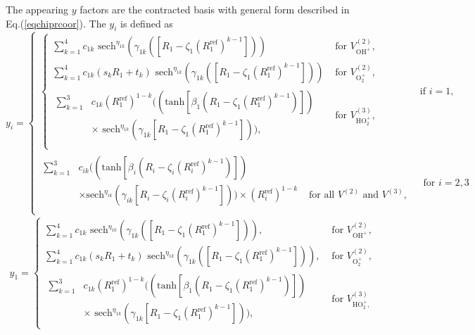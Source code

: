 \documentclass[12pt]{article}
\def\D{\displaystyle}
\begin{document}
The appearing $y$ factors are the contracted basis with general form described in Eq.(\ref{eqchiprcoor}). The $y_i$ is defined as
\begin{equation}
  y_i =
  \begin{cases}
    \begin{cases}
        \D\sum_{k=1}^4 c_{1k}\text{ sech}^{\eta_{1k}}(\gamma_{1k}(\left[R_1 - \zeta_1(R_1^{\text{ref}})^{k-1}\right])) & \text{ for } V^{(2)}_{\text{OH}^+},\\
        \D\sum_{k=1}^4 c_{1k}(s_kR_1 + t_k)\text{ sech}^{\eta_{1k}}(\gamma_{1k}(\left[R_1 - \zeta_1(R_1^{\text{ref}})^{k-1}\right])) & \text{ for } V^{(2)}_{\text{O}_2^+}, \\
        \begin{split}
            \D\sum_{k=1}^3 &c_{1k}(R_1^{\text{ref}})^{1-k}((\text{tanh}\left[\beta_1(R_1 - \zeta_1(R_1^\text{ref})^{k-1})\right]) \\ &\times \text{ sech}^{\eta_{1k}}(\gamma_{1k}\left[R_1 - \zeta_1(R_1^{\text{ref}})^{k-1}\right])), 
        \end{split}
        & \text{ for } V^{(3)}_{\text{HO}_2^+}, \\
    \end{cases}
    & \text{if }i=1, \\
    \begin{split}
        \D\sum_{k=1}^3 &c_{ik}((\text{tanh}\left[\beta_i(R_i - \zeta_i(R_i^\text{ref})^{k-1})\right]) \\ &\times   \text{sech}^{\eta_{ik}}(\gamma_{ik}\left[R_i - \zeta_i(R_i^{\text{ref}})^{k-1}\right])) \times {(R_i^{\text{ref}})^{1-k}}
        & \text{ for all }V^{(2)} \text{ and } V^{(3)}, \\
    \end{split}
    & \text{ for } i=2,3
  \end{cases}
  \label{eq:chipry}
\end{equation}
\iffalse %
\begin{equation}
    \begin{split}
        y_1 = 
        \begin{cases}
            \D\sum_{k=1}^4 c_{1k}\text{ sech}^{\eta_{1k}}(\gamma_{1k}(\left[R_1 - \zeta_1(R_1^{\text{ref}})^{k-1}\right])), &\text{ for } V^{(2)}_{\text{OH}^+},\\
            \D\sum_{k=1}^4 c_{1k}(s_kR_1 + t_k)\text{ sech}^{\eta_{1k}}(\gamma_{1k}(\left[R_1 - \zeta_1(R_1^{\text{ref}})^{k-1}\right])), &\text{ for } V^{(2)}_{\text{O}_2^+}, \\
            \begin{split}
                \D\sum_{k=1}^3 &c_{1k}(R_1^{\text{ref}})^{1-k}((\text{tanh}\left[\beta_1(R_1 - \zeta_1(R_1^\text{ref})^{k-1})\right]) \\ &\times \text{ sech}^{\eta_{1k}}(\gamma_{1k}\left[R_1 - \zeta_1(R_1^{\text{ref}})^{k-1}\right])), 
            \end{split}
            &\text{ for } V^{(3)}_{\text{HO}_2^+,}
        \end{cases}
    \end{split}
    \label{eq:ho2+chipry1}
\end{equation}
\end{document}
